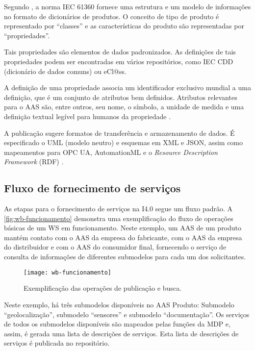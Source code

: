 	Segundo , a norma IEC 61360 fornece uma estrutura e um modelo de informações no formato de dicionários de produtos. O conceito de tipo de produto é representado por ``classes'' e as características do produto são representadas por ``propriedades''.
	
	Tais propriedades são elementos de dados padronizados. As definições de tais propriedades podem ser encontradas em vários repositórios, como IEC CDD (dicionário de dados comuns) ou eCl@ss.
	
	A definição de uma propriedade associa um identificador exclusivo mundial a uma definição, que é um conjunto de atributos bem definidos. Atributos relevantes para o AAS são, entre outros, seu nome, o símbolo, a unidade de medida e uma definição textual legível para humanos da propriedade \cite{bader2019aas}.
	
	A publicação sugere formatos de transferência e armazenamento de dados. É especificado o UML (modelo neutro) e esquemas em XML e JSON, assim como mapeamentos para OPC UA, AutomationML e o \textit{Resource Description Framework} (RDF) \cite{plattform2019detailsaas}.
	
\subsection{Fluxo de fornecimento de serviços}

	As etapas para o fornecimento de serviços na I4.0 segue um fluxo padrão. A \autoref{fig:wb-funcionamento} demonstra uma exemplificação do fluxo de operações básicas de um WS em funcionamento. Neste exemplo, um AAS de um produto mantém contato com o AAS da empresa do fabricante, com o AAS da empresa do distribuidor e com o AAS do consumidor final, fornecendo o serviço de consulta de informações de diferentes submodelos para cada um dos solicitantes. 	
	
	\begin{figure}[htb]
		\centering
		\caption{Exemplificação das operações de publicação e busca.}
		\label{fig:wb-funcionamento}
		\texttt{[image: wb-funcionamento]}
	\end{figure}

	Neste exemplo, há três submodelos disponíveis no AAS Produto: Submodelo ``geolocalização'', submodelo ``sensores'' e submodelo ``documentação''. Os serviços de todos os submodelos disponíveis são mapeados pelas funções da MDP e, assim, é gerada uma lista de descrições de serviços. Esta lista de descrições de serviços é publicada no repositório.
	
